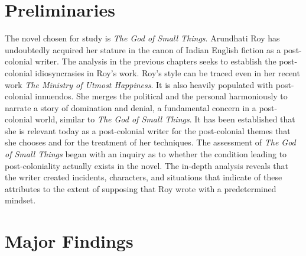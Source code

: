 
\section{Preliminaries}

The novel chosen for study is \emph{The God of Small Things}. Arundhati Roy has undoubtedly acquired her stature in the canon of Indian English fiction as a post-colonial writer.  The analysis in the previous chapters seeks to establish the post-colonial idiosyncrasies in Roy's work. Roy's style can be traced even in her recent work \emph{The Ministry of Utmost Happiness}. It is also heavily populated with post-colonial innuendos. She merges the political and the personal harmoniously to narrate a story of domination and denial, a fundamental concern in a post-colonial world, similar to \emph{The God of Small Things}. It has been established that she is relevant today as a post-colonial writer for the post-colonial themes that she chooses and for the treatment of her techniques. The assessment of \emph{The God of Small Things} began with an inquiry as to whether the condition leading to post-coloniality actually exists in the novel. The in-depth analysis reveals that the writer created incidents, characters, and situations that indicate of these attributes to the extent of supposing that Roy wrote with a predetermined mindset.

\section{Major Findings}

